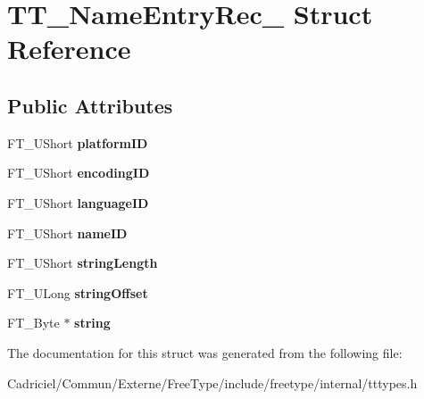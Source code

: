 \hypertarget{struct_t_t___name_entry_rec__}{}\section{T\+T\+\_\+\+Name\+Entry\+Rec\+\_\+ Struct Reference}
\label{struct_t_t___name_entry_rec__}
\subsection*{Public Attributes}
\begin{DoxyCompactItemize}
\item 
F\+T\+\_\+\+U\+Short {\bfseries platform\+ID}\hypertarget{struct_t_t___name_entry_rec___a9d4ee8bc42ed087f4533b6f664c0f6c6}{}\label{struct_t_t___name_entry_rec___a9d4ee8bc42ed087f4533b6f664c0f6c6}

\item 
F\+T\+\_\+\+U\+Short {\bfseries encoding\+ID}\hypertarget{struct_t_t___name_entry_rec___a8e7403a2f37c7f7fdb3c19e9549d315c}{}\label{struct_t_t___name_entry_rec___a8e7403a2f37c7f7fdb3c19e9549d315c}

\item 
F\+T\+\_\+\+U\+Short {\bfseries language\+ID}\hypertarget{struct_t_t___name_entry_rec___a2ec03c0ff0c542f403b45a515bb20afb}{}\label{struct_t_t___name_entry_rec___a2ec03c0ff0c542f403b45a515bb20afb}

\item 
F\+T\+\_\+\+U\+Short {\bfseries name\+ID}\hypertarget{struct_t_t___name_entry_rec___abdaaec01d6620b3801f233cde5964548}{}\label{struct_t_t___name_entry_rec___abdaaec01d6620b3801f233cde5964548}

\item 
F\+T\+\_\+\+U\+Short {\bfseries string\+Length}\hypertarget{struct_t_t___name_entry_rec___a736e5f8caeada86cc33f62acca6537f5}{}\label{struct_t_t___name_entry_rec___a736e5f8caeada86cc33f62acca6537f5}

\item 
F\+T\+\_\+\+U\+Long {\bfseries string\+Offset}\hypertarget{struct_t_t___name_entry_rec___a33ed41d4d3c4fffa74193f3b52e11870}{}\label{struct_t_t___name_entry_rec___a33ed41d4d3c4fffa74193f3b52e11870}

\item 
F\+T\+\_\+\+Byte $\ast$ {\bfseries string}\hypertarget{struct_t_t___name_entry_rec___aefa752d5c88149f8e64122e14855d831}{}\label{struct_t_t___name_entry_rec___aefa752d5c88149f8e64122e14855d831}

\end{DoxyCompactItemize}


The documentation for this struct was generated from the following file\+:\begin{DoxyCompactItemize}
\item 
Cadriciel/\+Commun/\+Externe/\+Free\+Type/include/freetype/internal/tttypes.\+h\end{DoxyCompactItemize}
